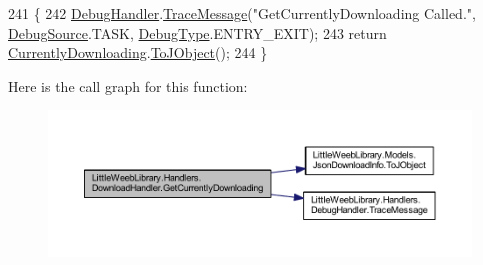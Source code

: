\begin{DoxyCode}
241         \{
242             \mbox{\hyperlink{class_little_weeb_library_1_1_handlers_1_1_download_handler_a9f1aedadbd6f343d8de1c54724eca11e}{DebugHandler}}.\mbox{\hyperlink{interface_little_weeb_library_1_1_handlers_1_1_i_debug_handler_a2e405bc3492e683cd3702fae125221bc}{TraceMessage}}(\textcolor{stringliteral}{"GetCurrentlyDownloading Called."}, 
      \mbox{\hyperlink{namespace_little_weeb_library_1_1_handlers_a2a6ca0775121c9c503d58aa254d292be}{DebugSource}}.TASK, \mbox{\hyperlink{namespace_little_weeb_library_1_1_handlers_ab66019ed40462876ec4e61bb3ccb0a62}{DebugType}}.ENTRY\_EXIT);
243             \textcolor{keywordflow}{return} \mbox{\hyperlink{class_little_weeb_library_1_1_handlers_1_1_download_handler_a45f8f3fe581060feacfedcaee99d9363}{CurrentlyDownloading}}.\mbox{\hyperlink{class_little_weeb_library_1_1_models_1_1_json_download_info_a9a8921b52b118be5bc135ad49a4aee29}{ToJObject}}();
244         \}
\end{DoxyCode}
Here is the call graph for this function\+:\nopagebreak
\begin{figure}[H]
\begin{center}
\leavevmode
\includegraphics[width=350pt]{class_little_weeb_library_1_1_handlers_1_1_download_handler_a3d913e57fb5f46a736c02858364609f9_cgraph}
\end{center}
\end{figure}
\mbox{\label{class_little_weeb_library_1_1_handlers_1_1_download_handler_a8e40df55d254c0b95bb0a72becde5039}} 
